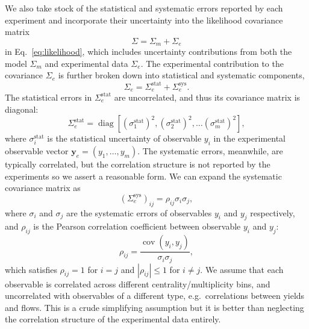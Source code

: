 \documentclass[aps,prc,reprint,amsmath,nofootinbib]{revtex4-1}
\newcommand{\yv}{\mathbf y}
\DeclareMathOperator{\diag}{diag}
\DeclareMathOperator{\cov}{cov}
\begin{document}
We also take stock of the statistical and systematic errors reported by each experiment and incorporate their uncertainty into the likelihood covariance matrix
\begin{equation}
  \Sigma = \Sigma_m + \Sigma_e
\end{equation}
in Eq.~\eqref{eq:likelihood}, which includes uncertainty contributions from both the model $\Sigma_m$ and experimental data $\Sigma_e$.
The experimental contribution to the covariance $\Sigma_e$ is further broken down into statistical and systematic components,
\begin{equation}
  \Sigma_e = \Sigma_e^\text{stat} + \Sigma_e^\text{sys}.
\end{equation}
The statistical errors in $\Sigma_e^\text{stat}$ are uncorrelated, and thus its covariance matrix is diagonal:
\begin{equation}
  \Sigma_e^\text{stat} = \diag[(\sigma^\text{stat}_1)^2, (\sigma^\text{stat}_2)^2, \dots (\sigma^\text{stat}_m)^2 ],
\end{equation}
where $\sigma^\text{stat}_i$ is the statistical uncertainty of observable $y_i$ in the experimental observable vector $\yv_e = (y_1, \dots, y_m)$.
The systematic errors, meanwhile, are typically correlated, but the correlation structure is not reported by the experiments so we assert a reasonable form.
We can expand the systematic covariance matrix as
\begin{equation}
  (\Sigma_e^\text{sys})_{ij} =  \rho_{ij} \sigma_i \sigma_j,
\end{equation}
where $\sigma_i$ and $\sigma_j$ are the systematic errors of observables $y_i$ and $y_j$ respectively, and $\rho_{ij}$ is the Pearson correlation coefficient between observable $y_i$ and $y_j$:
\begin{equation}
  \rho_{ij} = \frac{\cov(y_i, y_j)}{\sigma_i \sigma_j},
\end{equation}
which satisfies $\rho_{ij}=1$ for $i=j$ and $|\rho_{ij}| \le 1$ for $i \ne j$.
We assume that each observable is correlated across different centrality/multiplicity bins, and uncorrelated with observables of a different type, e.g.\ correlations between yields and flows.
This is a crude simplifying assumption but it is better than neglecting the correlation structure of the experimental data entirely.
\end{document}
